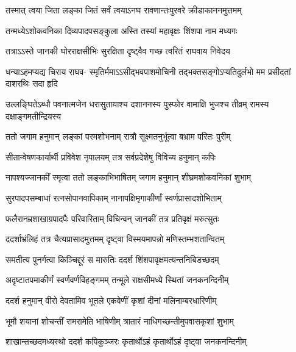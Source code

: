 \twolineshloka
{तस्मात् त्वया जिता लङ्का जितं सर्वं त्वयाऽनघ}
{रावणान्तःपुरवरे क्रीडाकाननमुत्तमम्} %

\twolineshloka
{तन्मध्येऽशोकवनिका दिव्यपादपसङ्कुला}
{अस्ति तस्यां महावृक्षः शिंशपा नाम मध्यगः} %

\twolineshloka
{तत्राऽऽस्ते जानकी घोरराक्षसीभिः सुरक्षिता}
{दृष्ट्वैव गच्छ त्वरितं राघवाय निवेदय} %

\fourlineindentedshloka
{धन्याऽहमप्यद्य चिराय राघव-}
{स्मृतिर्ममाऽऽसीद्भवपाशमोचिनी}
{तद्भक्तसङ्गोऽप्यतिदुर्लभो मम}
{प्रसीदतां दाशरथिः सदा हृदि} %

\fourlineindentedshloka
{उल्लङ्घितेऽब्धौ पवनात्मजेन}
{धरासुतायाश्च दशाननस्य}
{पुस्फोर वामाक्षि भुजश्च तीव्रम्}
{रामस्य दक्षाङ्गमतीन्द्रियस्य} %






\twolineshloka
{ततो जगाम हनुमान् लङ्कां परमशोभनाम्}
{रात्रौ सूक्ष्मतनुर्भूत्वा बभ्राम परितः पुरीम्} %

\twolineshloka
{सीतान्वेषणकार्यार्थी प्रविवेश नृपालयम्}
{तत्र सर्वप्रदेशेषु विविच्य हनुमान् कपिः} %

\twolineshloka
{नापश्यज्जानकीं स्मृत्वा ततो लङ्काभिभाषितम्}
{जगाम हनुमान् शीघ्रमशोकवनिकां शुभाम्} %

\twolineshloka
{सुरपादपसम्बाधां रत्नसोपानवापिकाम्}
{नानापक्षिमृगाकीर्णां स्वर्णप्रासादशोभिताम्} %

\twolineshloka
{फलैरानम्रशाखाग्रपादपैः परिवारिताम्}
{विचिन्वन् जानकीं तत्र प्रतिवृक्षं मरुत्सुतः} %

\twolineshloka
{ददर्शाभ्रंलिहं तत्र चैत्यप्रासादमुत्तमम्}
{दृष्ट्वा विस्मयमापन्नो मणिस्तम्भशतान्वितम्} %

\twolineshloka
{समतीत्य पुनर्गत्वा किञ्चिद्दूरं स मारुतिः}
{ददर्श शिंशपावृक्षमत्यन्तनिबिडच्छदम्} %

\twolineshloka
{अदृष्टातपमाकीर्णं स्वर्णवर्णविहङ्गमम्}
{तन्मूले राक्षसीमध्ये स्थितां जनकनन्दिनीम्} %

\twolineshloka
{ददर्श हनुमान् वीरो देवतामिव भूतले}
{एकवेणीं कृशां दीनां मलिनाम्बरधारिणीम्} %

\twolineshloka
{भूमौ शयानां शोचन्तीं रामरामेति भाषिणीम्}
{त्रातारं नाधिगच्छन्तीमुपवासकृशां शुभाम्} %

\twolineshloka
{शाखान्तच्छदमध्यस्थो ददर्श कपिकुञ्जरः}
{कृतार्थोऽहं कृतार्थोऽहं दृष्ट्वा जनकनन्दिनीम्} %

